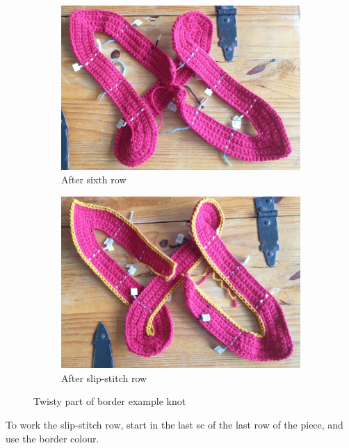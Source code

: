 \documentclass[openany]{book}
\newcommand{\bk}{border example knot}
\begin{document}
\begin{figure}[H]\centering
\begin{subfigure}[t]{.45\textwidth}\centering
\includegraphics[width=.95\textwidth]{bk/twist}
\caption{After sixth row}
\end{subfigure}
%
\begin{subfigure}[t]{.45\textwidth}
		\centering
		\includegraphics[width=.95\textwidth]{bk/twist2}
\caption{After slip-stitch row}
\end{subfigure}
\caption{Twisty part of \bk}
\end{figure}

To work the slip-stitch row, start in the last sc of the last row of the piece, and use the border colour.
\end{document}
